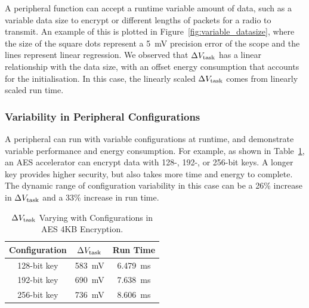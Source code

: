 A peripheral function can accept a runtime variable amount of data, such as a variable data size to encrypt or different lengths of packets for a radio to transmit. 
An example of this is plotted in Figure~\ref{fig:variable_datasize}, where the size of the square dots represent a \SI{5}{\milli\volt} precision error of the scope and the lines represent linear regression. 
We observed that $\Delta V_{\text{task}}$ has a linear relationship with the data size, with an offset energy consumption that accounts for the initialisation. 
In this case, the linearly scaled $\Delta V_{\text{task}}$ comes from linearly scaled run time. 



\subsubsection{Variability in Peripheral Configurations}

A peripheral can run with variable configurations at runtime, and demonstrate variable performance and energy consumption. 
For example, as shown in Table~\ref{tab:configurations}, an AES accelerator can encrypt data with 128-, 192-, or 256-bit keys. 
A longer key provides higher security, but also takes more time and energy to complete.
The dynamic range of configuration variability in this case can be a 26\% increase in $\Delta V_{\text{task}}$ and a 33\% increase in run time.

\begin{table}
    \renewcommand{\arraystretch}{1.2}
    \centering
    \begin{tabular}{|c|c|c|}
    \hline
    \textbf{Configuration} & \textbf{$\Delta V_{\text{task}}$} & \textbf{Run Time} \\
    \hline
    128-bit key & \SI{583}{\milli\volt} & \SI{6.479}{\milli\second} \\
    192-bit key & \SI{690}{\milli\volt} & \SI{7.638}{\milli\second} \\
    256-bit key & \SI{736}{\milli\volt} & \SI{8.606}{\milli\second} \\
    \hline
    \end{tabular}
    \caption{$\Delta V_{\text{task}}$ Varying with Configurations in AES 4KB Encryption.}
    \label{tab:configurations}
\end{table}

